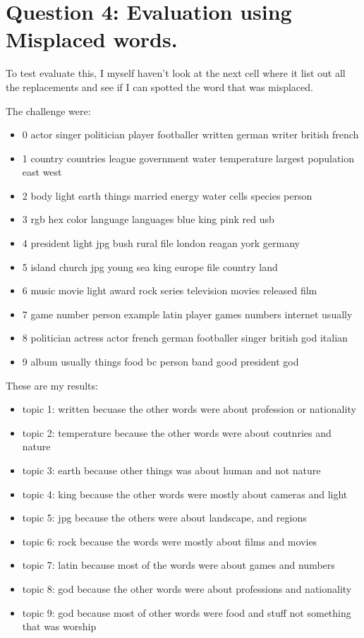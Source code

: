 \documentclass[a4paper]{article}
\begin{document}
\section{Question 4: Evaluation using Misplaced words.}

To test evaluate this, I myself haven't look at the next cell where it list out
all the replacements and see if I can spotted the word that was misplaced.

The challenge were:
\begin{itemize}
	\item 0 actor singer politician player footballer written german writer british french
	\item 1 country countries league government water temperature largest population east west
	\item 2 body light earth things married energy water cells species person
	\item 3 rgb hex color language languages blue king pink red usb
	\item 4 president light jpg bush rural file london reagan york germany
	\item 5 island church jpg young sea king europe file country land
	\item 6 music movie light award rock series television movies released film
	\item 7 game number person example latin player games numbers internet usually
	\item 8 politician actress actor french german footballer singer british god italian
	\item 9 album usually things food bc person band good president god
\end{itemize}

These are my results:
\begin{itemize}
	\item topic 1: written becuase the other words were about profession or nationality
	\item topic 2: temperature because the other words were about coutnries and nature
	\item topic 3: earth because other things was about human and not nature
	\item topic 4: king because the other words were mostly about cameras and light
	\item topic 5: jpg because the others were about landscape, and regions
	\item topic 6: rock because the words were mostly about films and movies
	\item topic 7: latin because most of the words were about games and numbers
	\item topic 8: god because the other words were about professions and nationality
	\item topic 9: god because most of other words were food and stuff not something that
	      was worship
\end{itemize}
\end{document}
